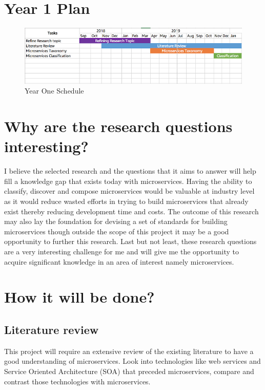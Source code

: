\documentclass{article}
\begin{document}
\section{Year 1 Plan}


\begin{figure}[h]
\includegraphics{projectplan.png}
\caption{Year One Schedule}
\end{figure}

\section{Why are the research questions interesting?}


I believe the selected research and the questions that it aims to answer will help fill a knowledge gap that exists today with microservices. Having the ability to classify, discover and compose microservices would be valuable at industry level as it would reduce wasted efforts in trying to build microservices that already exist thereby reducing development time and costs. The outcome of this research may also lay the foundation for devising a set of standards for building microservices though outside the scope of this project it may be a good opportunity to further this research. Last but not least, these research questions are a very interesting challenge for me and will give me the opportunity to acquire significant knowledge in an area of interest namely microservices.


\section{How it will be done?}

\subsection{Literature review}
This project will require an extensive review of the existing literature to have a good understanding of microservices. Look into technologies like web services and Service Oriented Architecture (SOA) that preceded microservices, compare and contrast those technologies with microservices.
\end{document}
